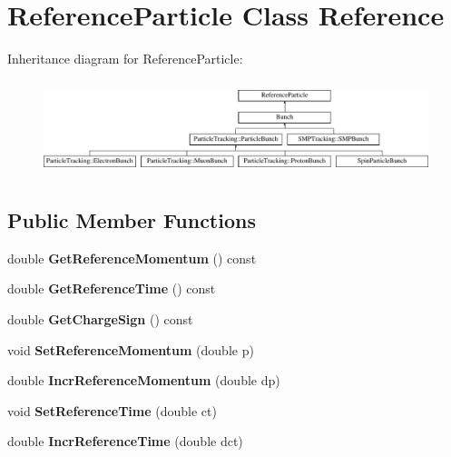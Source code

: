 \hypertarget{classReferenceParticle}{}\section{Reference\+Particle Class Reference}
\label{classReferenceParticle}
Inheritance diagram for Reference\+Particle\+:\begin{figure}[H]
\begin{center}
\leavevmode
\includegraphics[height=2.786070cm]{classReferenceParticle}
\end{center}
\end{figure}
\subsection*{Public Member Functions}
\begin{DoxyCompactItemize}
\item 
\mbox{\label{classReferenceParticle_a022c65c297e33f2ea37b3e20977e6b26}} 
double {\bfseries Get\+Reference\+Momentum} () const
\item 
\mbox{\label{classReferenceParticle_aa058d2aebbfdf71c74e5cfc6d9126c1c}} 
double {\bfseries Get\+Reference\+Time} () const
\item 
\mbox{\label{classReferenceParticle_ab36a837877034ee10b9a8dacb37fe51d}} 
double {\bfseries Get\+Charge\+Sign} () const
\item 
\mbox{\label{classReferenceParticle_a4ddc425b08ea8350b67cd37a7b14e3bc}} 
void {\bfseries Set\+Reference\+Momentum} (double p)
\item 
\mbox{\label{classReferenceParticle_aebb548cd2094e2af1f9f57579eebf544}} 
double {\bfseries Incr\+Reference\+Momentum} (double dp)
\item 
\mbox{\label{classReferenceParticle_a4d14e2fa09781f375f64549b739ef549}} 
void {\bfseries Set\+Reference\+Time} (double ct)
\item 
\mbox{\label{classReferenceParticle_ac0c3f9887a68cd993863c14eb499057c}} 
double {\bfseries Incr\+Reference\+Time} (double dct)
\end{DoxyCompactItemize}
